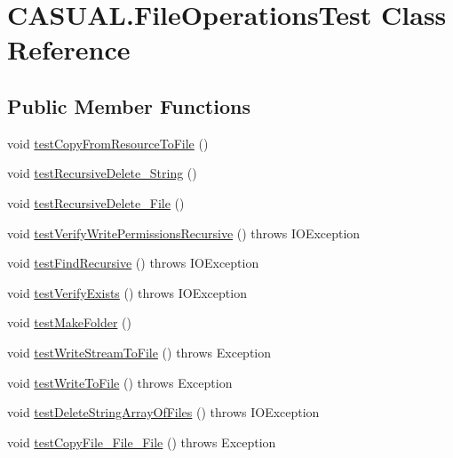 \hypertarget{classCASUAL_1_1FileOperationsTest}{\section{C\-A\-S\-U\-A\-L.\-File\-Operations\-Test Class Reference}
\label{classCASUAL_1_1FileOperationsTest}
}
\subsection*{Public Member Functions}
\begin{DoxyCompactItemize}
\item 
void \hyperlink{classCASUAL_1_1FileOperationsTest_aa83ffbd97d3335695f70f4e0b445b275}{test\-Copy\-From\-Resource\-To\-File} ()
\item 
void \hyperlink{classCASUAL_1_1FileOperationsTest_a199ede33b2f73e1ab1e1b70f0007deac}{test\-Recursive\-Delete\-\_\-\-String} ()
\item 
void \hyperlink{classCASUAL_1_1FileOperationsTest_abdcd987901d93504d75df2f5451716f2}{test\-Recursive\-Delete\-\_\-\-File} ()
\item 
void \hyperlink{classCASUAL_1_1FileOperationsTest_abe7a7ea3384a6c592265d8f5e912de9c}{test\-Verify\-Write\-Permissions\-Recursive} ()  throws I\-O\-Exception 
\item 
void \hyperlink{classCASUAL_1_1FileOperationsTest_af9232c145c57fe7ebfabbeb9848684d8}{test\-Find\-Recursive} ()  throws I\-O\-Exception 
\item 
void \hyperlink{classCASUAL_1_1FileOperationsTest_a1fe7d7eb1f0279b8a1951498a949393b}{test\-Verify\-Exists} ()  throws I\-O\-Exception 
\item 
void \hyperlink{classCASUAL_1_1FileOperationsTest_a6eff05750f82920d4c71770a920dcfc4}{test\-Make\-Folder} ()
\item 
void \hyperlink{classCASUAL_1_1FileOperationsTest_af98e032770596afee74a4581f4d9d5a6}{test\-Write\-Stream\-To\-File} ()  throws Exception 
\item 
void \hyperlink{classCASUAL_1_1FileOperationsTest_a083645a1e316e49e571fd2db0f47c6db}{test\-Write\-To\-File} ()  throws Exception 
\item 
void \hyperlink{classCASUAL_1_1FileOperationsTest_ac3c8eb6dbb6177a2904d66fa8d5423ef}{test\-Delete\-String\-Array\-Of\-Files} ()  throws I\-O\-Exception 
\item 
void \hyperlink{classCASUAL_1_1FileOperationsTest_aba706f9362618ceb037ef6a9774633b0}{test\-Copy\-File\-\_\-\-File\-\_\-\-File} ()  throws Exception 

\end{DoxyCompactItemize}
